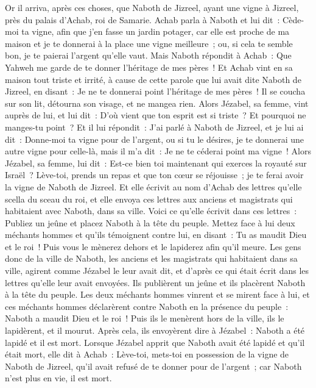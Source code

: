 \begin{multicols}{2}
\VerseOne{}Or il arriva, après ces choses, que Naboth de Jizreel, ayant une vigne à Jizreel, près du palais d'Achab, roi de Samarie.
Achab parla à Naboth et lui dit~: Cède-moi ta vigne, afin que j'en fasse un jardin potager, car elle est proche de ma maison et je te donnerai à la place une vigne meilleure~; ou, si cela te semble bon, je te paierai l'argent qu'elle vaut.
Mais Naboth répondit à Achab~: Que Yahweh me garde de te donner l'héritage de mes pères~!
Et Achab vint en sa maison tout triste et irrité, à cause de cette parole que lui avait dite Naboth de Jizreel, en disant~: Je ne te donnerai point l'héritage de mes pères~! Il se coucha sur son lit, détourna son visage, et ne mangea rien.
Alors Jézabel, sa femme, vint auprès de lui, et lui dit~: D'où vient que ton esprit est si triste~? Et pourquoi ne manges-tu point~?
Et il lui répondit~: J'ai parlé à Naboth de Jizreel, et je lui ai dit~: Donne-moi ta vigne pour de l'argent, ou si tu le désires, je te donnerai une autre vigne pour celle-là, mais il m'a dit~: Je ne te céderai point ma vigne~!
Alors Jézabel, sa femme, lui dit~: Est-ce bien toi maintenant qui exerces la royauté sur Israël~? Lève-toi, prends un repas et que ton cœur se réjouisse~; je te ferai avoir la vigne de Naboth de Jizreel.
Et elle écrivit au nom d'Achab des lettres qu'elle scella du sceau du roi, et elle envoya ces lettres aux anciens et magistrats qui habitaient avec Naboth, dans sa ville.
Voici ce qu'elle écrivit dans ces lettres~: Publiez un jeûne et placez Naboth à la tête du peuple.
Mettez face à lui deux méchants hommes et qu'ils témoignent contre lui, en disant~: Tu as maudit Dieu et le roi~! Puis vous le mènerez dehors et le lapiderez afin qu'il meure.
Les gens donc de la ville de Naboth, les anciens et les magistrats qui habitaient dans sa ville, agirent comme Jézabel le leur avait dit, et d'après ce qui était écrit dans les lettres qu'elle leur avait envoyées.
Ils publièrent un jeûne et ils placèrent Naboth à la tête du peuple.
Les deux méchants hommes vinrent et se mirent face à lui, et ces méchants hommes déclarèrent contre Naboth en la présence du peuple~: Naboth a maudit Dieu et le roi~! Puis ils le menèrent hors de la ville, ils le lapidèrent, et il mourut.
Après cela, ils envoyèrent dire à Jézabel~: Naboth a été lapidé et il est mort.
Lorsque Jézabel apprit que Naboth avait été lapidé et qu'il était mort, elle dit à Achab~: Lève-toi, mets-toi en possession de la vigne de Naboth de Jizreel, qu'il avait refusé de te donner pour de l'argent~; car Naboth n'est plus en vie, il est mort.

\end{multicols}
